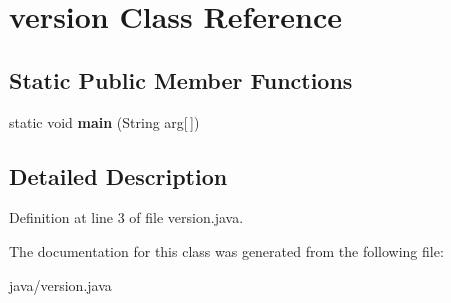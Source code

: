 \section{version Class Reference}
\label{classorg_1_1smallfoot_1_1xpath_1_1version}
\subsection*{Static Public Member Functions}
\begin{DoxyCompactItemize}
\item 
static void {\bfseries main} (String arg[$\,$])\label{classorg_1_1smallfoot_1_1xpath_1_1version_ae4faf7ff4190d227357ef851490d7757}

\end{DoxyCompactItemize}


\subsection{Detailed Description}


Definition at line 3 of file version.\-java.



The documentation for this class was generated from the following file\-:\begin{DoxyCompactItemize}
\item 
java/version.\-java\end{DoxyCompactItemize}
